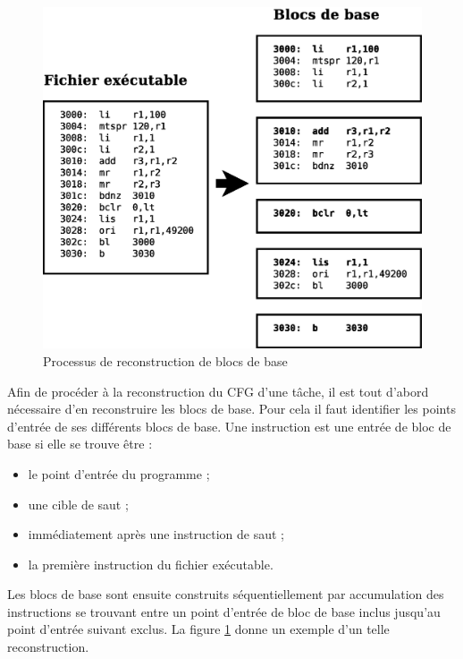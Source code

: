   
  \begin{figure}[ht]
    \centering
    \includegraphics[scale=0.3]{img/recons1.eps}
    \caption{Processus de reconstruction de blocs de base}
    \label{fig:recons1}
  \end{figure}

  Afin de procéder à la reconstruction du CFG d'une tâche, il est tout d'abord
  nécessaire d'en reconstruire les blocs de base. Pour cela il faut identifier
  les points d'entrée de ses différents blocs de base. Une instruction est une
  entrée de bloc de base si elle se trouve être :
    \begin{itemize}
      \item le point d'entrée du programme ;
      \item une cible de saut ;
      \item immédiatement après une instruction de saut ;
      \item la première instruction du fichier exécutable.
    \end{itemize}
  Les blocs de base sont ensuite construits séquentiellement par accumulation
  des instructions se trouvant entre un point d'entrée de bloc de base inclus
  jusqu'au point d'entrée suivant exclus. La figure \ref{fig:recons1} donne un
  exemple d'un telle reconstruction.


